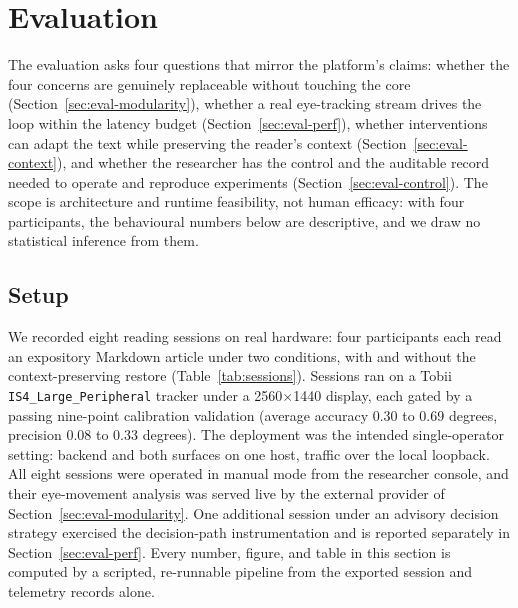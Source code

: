 \section{Evaluation}
\label{sec:eval}

The evaluation asks four questions that mirror the platform's claims: whether the four concerns are genuinely replaceable without touching the core (Section~\ref{sec:eval-modularity}), whether a real eye-tracking stream drives the loop within the latency budget (Section~\ref{sec:eval-perf}), whether interventions can adapt the text while preserving the reader's context (Section~\ref{sec:eval-context}), and whether the researcher has the control and the auditable record needed to operate and reproduce experiments (Section~\ref{sec:eval-control}).
The scope is architecture and runtime feasibility, not human efficacy: with four participants, the behavioural numbers below are descriptive, and we draw no statistical inference from them.

\subsection{Setup}
\label{sec:eval-setup}

We recorded eight reading sessions on real hardware: four participants each read an expository Markdown article under two conditions, with and without the context-preserving restore (Table~\ref{tab:sessions}).
Sessions ran on a Tobii \texttt{IS4\_Large\_Peripheral} tracker under a 2560$\times$1440 display, each gated by a passing nine-point calibration validation (average accuracy 0.30 to 0.69 degrees, precision 0.08 to 0.33 degrees).
The deployment was the intended single-operator setting: backend and both surfaces on one host, traffic over the local loopback.
All eight sessions were operated in manual mode from the researcher console, and their eye-movement analysis was served live by the external provider of Section~\ref{sec:eval-modularity}.
One additional session under an advisory decision strategy exercised the decision-path instrumentation and is reported separately in Section~\ref{sec:eval-perf}.
Every number, figure, and table in this section is computed by a scripted, re-runnable pipeline from the exported session and telemetry records alone.

